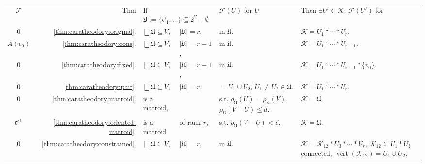\documentclass[a4paper,11pt,reqno, english]{amsart}
\theoremstyle{definition}
\theoremstyle{remark}
\DeclareMathOperator{\vertex}{\mathrm{vert}}
\begin{document}
\begin{table}[ht]
    \centering
    \renewcommand{\arraystretch}{1.5}
    \begin{tabular}{c|r|ll|l|l|}
        \cline{2-6}
        $\mathcal{F}$ &
        Thm & 
        \multicolumn{2}{l|}{If $\mathfrak{U}:=\{U_1,\ldots\}\subseteq 2^V-\emptyset$} & 
        $\mathcal{F}(U)$ for $U$ & 
        Then $\exists U'\in\mathscr{K}$: $\mathcal{F}(U')$ for \\\cline{2-6}\cline{2-6}
        $0$ &
        \ref{thm:caratheodory:original}. & 
        $\bigsqcup\mathfrak{U}\subseteq V$, & 
        $|\mathfrak{U}|=r$, & 
        in $\mathfrak{U}$. & 
        $\mathscr{K}=U_1*\cdots*U_r$. \\\cline{2-6}
        $A(v_0)$ &
        \ref{thm:caratheodory:cone}. &
        $\bigsqcup\mathfrak{U}\subseteq V$, &
        $|\mathfrak{U}|=r-1$, &
        in $\mathfrak{U}$. &
        $\mathscr{K}=U_1*\cdots*U_{r-1}$.\\\cline{2-6}
        $0$ &
        \ref{thm:caratheodory:fixed}. & 
        $\bigsqcup\mathfrak{U}\subseteq V$, & 
        $|\mathfrak{U}|=r-1$, & 
        in $\mathfrak{U}$. & 
        $\mathscr{K}=U_1*\cdots*U_{r-1}*\{v_0\}$. \\\cline{2-6}
        $0$ &
        \ref{thm:caratheodory:pair}. & 
        $\bigsqcup\mathfrak{U}\subseteq V$, &
        $|\mathfrak{U}|=r$, &
        \makecell[l]{$=U_1\cup U_2$,\\$U_1\neq U_2\in\mathfrak{U}$.} &
        $\mathscr{K}=U_1*\cdots*U_r$. \\\cline{2-6}
        $0$ &
        \ref{thm:caratheodory:matroid}. &
        is a matroid, &
        &
        \makecell[l]{s.t. $\rho_\mathfrak{U}(U)=\rho_\mathfrak{U}(V)$,\\ $\rho_\mathfrak{U}(V-U)\leq d$.} &
        $\mathscr{K}=\mathfrak{U}$. \\\cline{2-6}
        $\mathscr{C}^+$ &
        \ref{thm:caratheodory:oriented-matroid}. &
        is a matroid &
        of rank $r$, & 
        s.t. $\rho_\mathfrak{U}(V-U)<d$. &
        $\mathscr{K}=\mathfrak{U}$. \\\cline{2-6}
        $0$ &
        \ref{thm:caratheodory:constrained}. & 
        $\bigsqcup\mathfrak{U}\subseteq V$, &
        $|\mathfrak{U}|=r$, & 
        in $\mathfrak{U}$. &
        \makecell[l]{$\mathscr{K}=\mathscr{K}_{12}*U_3*\cdots*U_r$,\\ $\mathscr{K}_{12}\subseteq U_1*U_2$ connected,\\$\vertex(\mathscr{K}_{12})=U_1\cup U_2$.} \\\cline{2-6}

\end{tabular}
\end{table}
\end{document}
